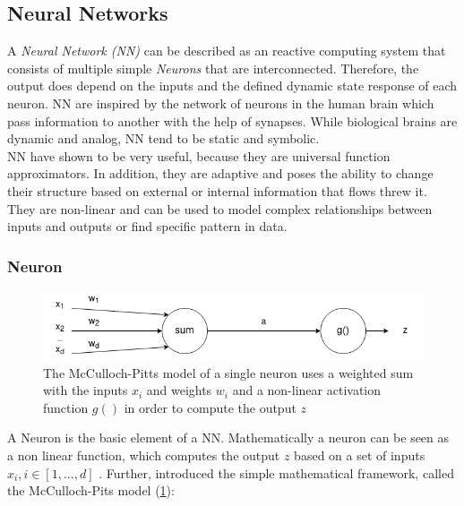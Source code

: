 

\newpage

\subsection{Neural Networks} \label{sec:NN}
A \emph{Neural Network (NN)} can be described as an reactive computing system that consists of multiple simple \emph{Neurons} that are interconnected. Therefore, the output does depend on the inputs and the defined dynamic state response of each neuron. NN are inspired by the network of neurons in the human brain which pass information to another with the help of synapses. While biological brains are dynamic and analog, NN tend to be static and symbolic.\\
NN have shown to be very useful, because they are universal function approximators. In addition, they are adaptive
and poses the ability to change their structure based on external or internal information that flows threw it. They are non-linear and can be used to model complex relationships between inputs and outputs or find specific pattern in data.

\subsubsection{Neuron}
\begin{figure}
	\centering
	\includegraphics[width=0.8 \linewidth]{figures/neuron.png}
	\caption{The McCulloch-Pitts model of a single neuron uses a weighted sum with the inputs $x_i$ and weights $w_i$ and a non-linear activation function $g()$ in order to compute the output $z$ \cite{10.1063/1.1144830}}
	\label{fig:neuron}
\end{figure}
A Neuron is the basic element of a NN. Mathematically a neuron can be seen as a non linear function, which computes the output $z$ based on a set of inputs $x_i, i \in [1,...,d]$ \cite{10.1063/1.1144830}. Further,  \cite{mcculloch1943logical} introduced the simple mathematical framework, called the McCulloch-Pits model (\cref{fig:neuron}):

